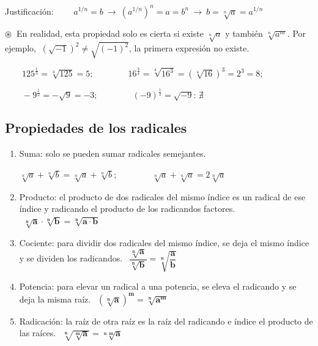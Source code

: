 \textcolor{gris}{Justificación: $\qquad a^{1/n}=b \ \to \ (a^{1/n})^n=a=b^n \ \to \ b=\sqrt[n]{a}=a^{1/n}$}

$ \circledast \ $ En realidad, esta propiedad solo es cierta si existe $\sqrt[n]{a}$ y también $\sqrt[n]{a^m}$. Por ejemplo, $\ (\sqrt{-1})^2 \neq \sqrt{(-1)^2}$, la primera expresión no existe.

\vspace{5mm}\begin{miejemplo}

$\qquad 125^{\frac 1 3 }= \sqrt[3]{125}=5; \qquad \qquad 16^{\frac 3 4}=\sqrt[4]{16^3}=(\sqrt[4]{16})^3=2^3=8;$

$\qquad -9^{\frac 1 2}=-\sqrt{9}=-3; \qquad \qquad 	(-9)^{\frac 1 2}=\sqrt{-9}:\, \nexists$
\end{miejemplo}


\vspace{5mm}

\subsection{Propiedades de los radicales}
\vspace{0.5cm}

\begin{theorem}
	
	\begin{enumerate}[P1. ]
	\item Suma: solo se pueden sumar radicales semejantes.
	
	$\sqrt[n]{a}+\sqrt[n]{b}=\sqrt[n]{a}+\sqrt[n]{b}; \qquad \qquad \sqrt[n]{a}+\sqrt[n]{a}=2\sqrt[n]{a}$	
	\item Producto: el producto de dos radicales del mismo índice es un radical de ese índice y radicando el producto de los radicandos factores.
	$ \ \ \boldsymbol{ \sqrt[n]{a}\cdot \sqrt[n]{b}=\sqrt[n]{a \cdot b}}$
	\item Cociente: para dividir dos radicales del mismo índice, se deja el mismo índice y se dividen los radicandos.
	$ \ \ \boldsymbol{ \dfrac{\sqrt[n]{a}}{\sqrt[n]{b}}=\sqrt[n]{\dfrac a b} }$
	\item Potencia: para elevar un radical a una potencia, se eleva el radicando y se deja la misma raíz. $\ \ \boldsymbol{(\sqrt[n]{a})^m = \sqrt[n]{a^m}}$
	\item Radicación: la raíz de otra raíz es la raíz del radicando e índice el producto de las raíces.  $\ \ \boldsymbol{ \sqrt[n]{\sqrt[m]{a}}=\sqrt[n\cdot m]{a} }$
	\end{enumerate}

\end{theorem}


